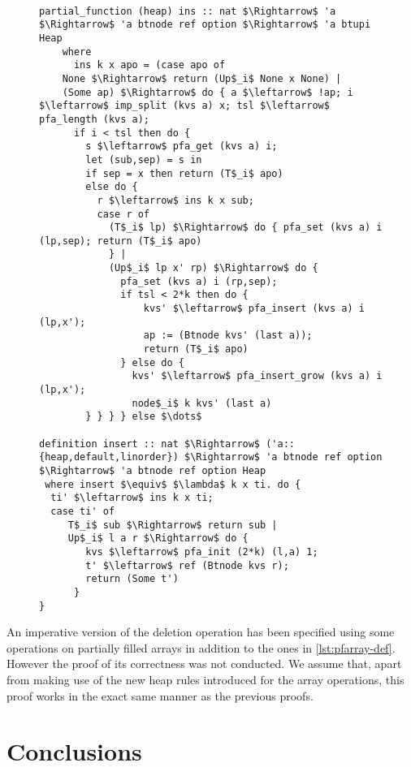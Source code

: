 \begin{figure}
\begin{lstlisting}[mathescape=true, language=Isabelle, label={lst:imp-ins-fun},
    caption={Excerpt of the imperative insert function}]

partial_function (heap) ins :: nat $\Rightarrow$ 'a $\Rightarrow$ 'a btnode ref option $\Rightarrow$ 'a btupi Heap 
    where 
      ins k x apo = (case apo of 
    None $\Rightarrow$ return (Up$_i$ None x None) | 
    (Some ap) $\Rightarrow$ do { a $\leftarrow$ !ap; i $\leftarrow$ imp_split (kvs a) x; tsl $\leftarrow$ pfa_length (kvs a); 
      if i < tsl then do { 
        s $\leftarrow$ pfa_get (kvs a) i; 
        let (sub,sep) = s in 
        if sep = x then return (T$_i$ apo) 
        else do { 
          r $\leftarrow$ ins k x sub; 
          case r of  
            (T$_i$ lp) $\Rightarrow$ do { pfa_set (kvs a) i (lp,sep); return (T$_i$ apo) 
            } | 
            (Up$_i$ lp x' rp) $\Rightarrow$ do { 
              pfa_set (kvs a) i (rp,sep); 
              if tsl < 2*k then do { 
                  kvs' $\leftarrow$ pfa_insert (kvs a) i (lp,x'); 
                  ap := (Btnode kvs' (last a)); 
                  return (T$_i$ apo) 
              } else do { 
                kvs' $\leftarrow$ pfa_insert_grow (kvs a) i (lp,x'); 
                node$_i$ k kvs' (last a) 
        } } } } else $\dots$

definition insert :: nat $\Rightarrow$ ('a::{heap,default,linorder}) $\Rightarrow$ 'a btnode ref option $\Rightarrow$ 'a btnode ref option Heap
 where insert $\equiv$ $\lambda$ k x ti. do {
  ti' $\leftarrow$ ins k x ti;
  case ti' of
     T$_i$ sub $\Rightarrow$ return sub |
     Up$_i$ l a r $\Rightarrow$ do {
        kvs $\leftarrow$ pfa_init (2*k) (l,a) 1;
        t' $\leftarrow$ ref (Btnode kvs r);
        return (Some t')
      }
}

\end{lstlisting}
\end{figure}

An imperative version of the deletion operation has been specified
using some operations on partially filled arrays in addition to 
the ones in \autoref{lst:pfarray-def}.
However the proof of its correctness was not conducted.
We assume that, apart from making use of the new
heap rules introduced for the array operations,
this proof works in the exact same manner as
the previous proofs.

\chapter{Conclusions}

